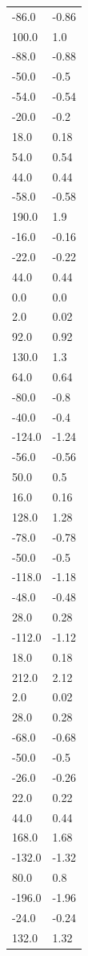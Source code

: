 \begin{longtable}{ll}
-86.0 & -0.86 \\
100.0 & 1.0 \\
-88.0 & -0.88 \\
-50.0 & -0.5 \\
-54.0 & -0.54 \\
-20.0 & -0.2 \\
18.0 & 0.18 \\
54.0 & 0.54 \\
44.0 & 0.44 \\
-58.0 & -0.58 \\
190.0 & 1.9 \\
-16.0 & -0.16 \\
-22.0 & -0.22 \\
44.0 & 0.44 \\
0.0 & 0.0 \\
2.0 & 0.02 \\
92.0 & 0.92 \\
130.0 & 1.3 \\
64.0 & 0.64 \\
-80.0 & -0.8 \\
-40.0 & -0.4 \\
-124.0 & -1.24 \\
-56.0 & -0.56 \\
50.0 & 0.5 \\
16.0 & 0.16 \\
128.0 & 1.28 \\
-78.0 & -0.78 \\
-50.0 & -0.5 \\
-118.0 & -1.18 \\
-48.0 & -0.48 \\
28.0 & 0.28 \\
-112.0 & -1.12 \\
18.0 & 0.18 \\
212.0 & 2.12 \\
2.0 & 0.02 \\
28.0 & 0.28 \\
-68.0 & -0.68 \\
-50.0 & -0.5 \\
-26.0 & -0.26 \\
22.0 & 0.22 \\
44.0 & 0.44 \\
168.0 & 1.68 \\
-132.0 & -1.32 \\
80.0 & 0.8 \\
-196.0 & -1.96 \\
-24.0 & -0.24 \\
132.0 & 1.32 \\

\end{longtable}
